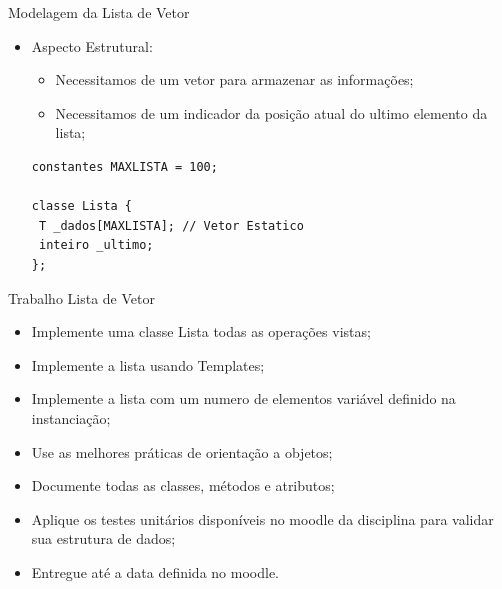 \documentclass[12pt,table,xcolor={dvipsnames}]{beamer}
\begin{document}
\begin{frame}[fragile]{Modelagem da Lista de Vetor}

\begin{itemize}
\item Aspecto Estrutural:
\begin{itemize}
\item Necessitamos de um vetor para armazenar as informações;
\item Necessitamos de um indicador da posição atual do ultimo elemento da lista;
\end{itemize}
\begin{lstlisting}
constantes MAXLISTA = 100;

classe Lista {
 T _dados[MAXLISTA]; // Vetor Estatico
 inteiro _ultimo;
};
\end{lstlisting}
\end{itemize}
\end{frame}



\begin{frame}[fragile]{Trabalho Lista de Vetor}
\begin{itemize}
\item Implemente uma classe Lista todas as operações vistas;
\item Implemente a lista usando Templates;
\item Implemente a lista com um numero de elementos variável definido na instanciação;
\item Use as melhores práticas de orientação a objetos;
\item Documente todas as classes, métodos e atributos;
\item Aplique os testes unitários disponíveis no moodle da disciplina para validar sua estrutura de dados;
\item Entregue até a data definida no moodle.
\end{itemize}
\end{frame}
\end{document}
